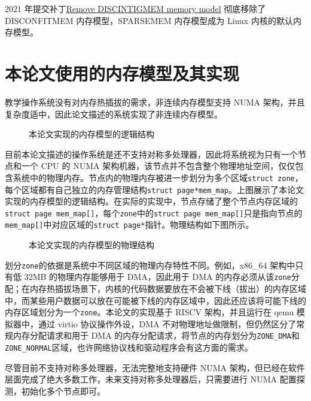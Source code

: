 \documentclass[AutoFakeBold]{LZUThesis}
\begin{document}
\begin{sloppypar}
2021 年提交补丁\href{https://lwn.net/Articles/858333}{Remove
DISCINTIGMEM memory model} 彻底移除了 DISCONFITMEM 内存模型，SPARSEMEM
内存模型成为 Linux 内核的默认内存模型。


\section{本论文使用的内存模型及其实现}

教学操作系统没有对内存热插拔的需求，非连续内存模型支持 NUMA
架构，并且复杂度适中，因此论文描述的系统实现了非连续内存模型。

\begin{figure}
\centering

\caption{本论文实现的内存模型的逻辑结构}
\end{figure}

目前本论文描述的操作系统是还不支持对称多处理器，因此将系统视为只有一个节点和一个
CPU 的 NUMA
架构机器，该节点并不包含整个物理地址空间，仅仅包含系统中的物理内存。节点内的物理内存被进一步划分为多个区域\texttt{struct\ zone}，每个区域都有自己独立的内存管理结构\texttt{struct\ page*mem\_map}。上图展示了本论文实现的内存模型的逻辑结构。在实际的实现中，节点存储了整个节点内存区域的\texttt{struct\ page\ mem\_map{[}{]}}，每个\texttt{zone}中的\texttt{struct\ page\ mem\_map{[}{]}}只是指向节点的\texttt{mem\_map{[}{]}}中对应区域的\texttt{struct\ page*}指针。物理结构如下图所示。

\begin{figure}
\centering

\caption{本论文实现的内存模型的物理结构}
\end{figure}

划分\texttt{zone}的依据是系统中不同区域的物理内存特性不同。例如，x86\_64
架构中只有低 32MB 的物理内存能够用于 DMA，因此用于 DMA
的内存必须从该\texttt{zone}分配；在内存热插拔场景下，内核的代码数据要放在不会被下线（拔出）的内存区域中，而某些用户数据可以放在可能被下线的内存区域中，因此还应该将可能下线的内存区域划分为一个\texttt{zone}。本论文的实现基于
RISCV 架构，并且运行在 qemu 模拟器中，通过 virtio 协议操作外设，DMA
不对物理地址做限制，但仍然区分了常规内存分配请求和用于 DMA
的内存分配请求，将节点的内存划分为\texttt{ZONE\_DMA}和\texttt{ZONE\_NORMAL}区域，也许网络协议栈和驱动程序会有这方面的需求。

尽管目前不支持对称多处理器，无法完整地支持硬件 NUMA
架构，但已经在软件层面完成了绝大多数工作，未来支持对称多处理器后，只需要进行
NUMA 配置探测，初始化多个节点即可。


\end{sloppypar}
\end{document}
